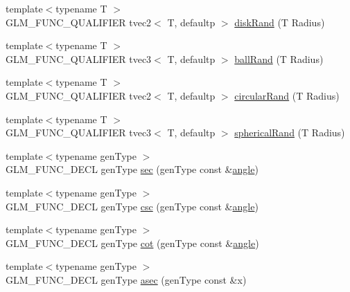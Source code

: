 \begin{DoxyCompactItemize}
\item 
{\footnotesize template$<$typename T $>$ }\\G\+L\+M\+\_\+\+F\+U\+N\+C\+\_\+\+Q\+U\+A\+L\+I\+F\+I\+E\+R tvec2$<$ T, defaultp $>$ \hyperlink{group__gtc__random_gad3a3ee7d26502a31ba552cb627a68606}{disk\+Rand} (T Radius)
\item 
{\footnotesize template$<$typename T $>$ }\\G\+L\+M\+\_\+\+F\+U\+N\+C\+\_\+\+Q\+U\+A\+L\+I\+F\+I\+E\+R tvec3$<$ T, defaultp $>$ \hyperlink{group__gtc__random_ga5506dee301160e3a06aef9b9bc7a0a83}{ball\+Rand} (T Radius)
\item 
{\footnotesize template$<$typename T $>$ }\\G\+L\+M\+\_\+\+F\+U\+N\+C\+\_\+\+Q\+U\+A\+L\+I\+F\+I\+E\+R tvec2$<$ T, defaultp $>$ \hyperlink{group__gtc__random_gae989c26a2899b2fb7444abe7c275c29c}{circular\+Rand} (T Radius)
\item 
{\footnotesize template$<$typename T $>$ }\\G\+L\+M\+\_\+\+F\+U\+N\+C\+\_\+\+Q\+U\+A\+L\+I\+F\+I\+E\+R tvec3$<$ T, defaultp $>$ \hyperlink{group__gtc__random_gaa9a6fc2d7a295b3857f7db23b1053d9d}{spherical\+Rand} (T Radius)
\item 
{\footnotesize template$<$typename gen\+Type $>$ }\\G\+L\+M\+\_\+\+F\+U\+N\+C\+\_\+\+D\+E\+C\+L gen\+Type \hyperlink{group__gtc__reciprocal_gabb6829a472da1cc94d88afa6396bed1f}{sec} (gen\+Type const \&\hyperlink{group__gtc__quaternion_gad4a4448baedb198b2b1e7880d2544dc9}{angle})
\item 
{\footnotesize template$<$typename gen\+Type $>$ }\\G\+L\+M\+\_\+\+F\+U\+N\+C\+\_\+\+D\+E\+C\+L gen\+Type \hyperlink{group__gtc__reciprocal_ga5df75de99f63e854087a06f538907b2c}{csc} (gen\+Type const \&\hyperlink{group__gtc__quaternion_gad4a4448baedb198b2b1e7880d2544dc9}{angle})
\item 
{\footnotesize template$<$typename gen\+Type $>$ }\\G\+L\+M\+\_\+\+F\+U\+N\+C\+\_\+\+D\+E\+C\+L gen\+Type \hyperlink{group__gtc__reciprocal_ga2f49e28c2634ae1a212e2fc38c42ad42}{cot} (gen\+Type const \&\hyperlink{group__gtc__quaternion_gad4a4448baedb198b2b1e7880d2544dc9}{angle})
\item 
{\footnotesize template$<$typename gen\+Type $>$ }\\G\+L\+M\+\_\+\+F\+U\+N\+C\+\_\+\+D\+E\+C\+L gen\+Type \hyperlink{group__gtc__reciprocal_gac9761980e09149002a466ca131a4bcac}{asec} (gen\+Type const \&x)

\end{DoxyCompactItemize}
